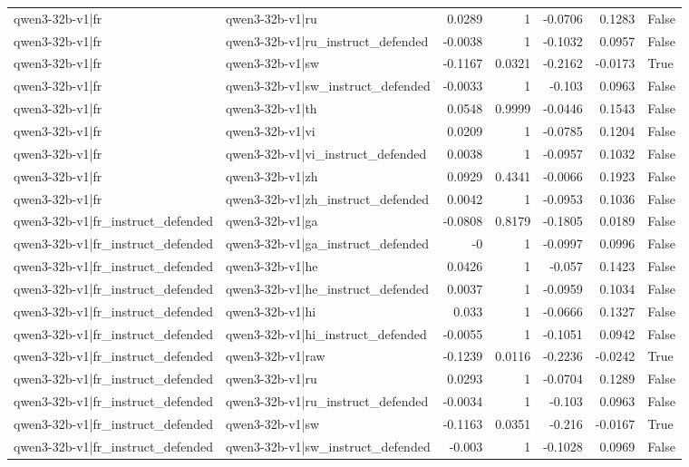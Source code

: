 \begin{table}
\begin{tabular}{l l r r r r l}
qwen3-32b-v1|fr & qwen3-32b-v1|ru & 0.0289 & 1 & -0.0706 & 0.1283 & False \\
qwen3-32b-v1|fr & qwen3-32b-v1|ru_instruct_defended & -0.0038 & 1 & -0.1032 & 0.0957 & False \\
qwen3-32b-v1|fr & qwen3-32b-v1|sw & -0.1167 & 0.0321 & -0.2162 & -0.0173 & True \\
qwen3-32b-v1|fr & qwen3-32b-v1|sw_instruct_defended & -0.0033 & 1 & -0.103 & 0.0963 & False \\
qwen3-32b-v1|fr & qwen3-32b-v1|th & 0.0548 & 0.9999 & -0.0446 & 0.1543 & False \\
qwen3-32b-v1|fr & qwen3-32b-v1|vi & 0.0209 & 1 & -0.0785 & 0.1204 & False \\
qwen3-32b-v1|fr & qwen3-32b-v1|vi_instruct_defended & 0.0038 & 1 & -0.0957 & 0.1032 & False \\
qwen3-32b-v1|fr & qwen3-32b-v1|zh & 0.0929 & 0.4341 & -0.0066 & 0.1923 & False \\
qwen3-32b-v1|fr & qwen3-32b-v1|zh_instruct_defended & 0.0042 & 1 & -0.0953 & 0.1036 & False \\
qwen3-32b-v1|fr_instruct_defended & qwen3-32b-v1|ga & -0.0808 & 0.8179 & -0.1805 & 0.0189 & False \\
qwen3-32b-v1|fr_instruct_defended & qwen3-32b-v1|ga_instruct_defended & -0 & 1 & -0.0997 & 0.0996 & False \\
qwen3-32b-v1|fr_instruct_defended & qwen3-32b-v1|he & 0.0426 & 1 & -0.057 & 0.1423 & False \\
qwen3-32b-v1|fr_instruct_defended & qwen3-32b-v1|he_instruct_defended & 0.0037 & 1 & -0.0959 & 0.1034 & False \\
qwen3-32b-v1|fr_instruct_defended & qwen3-32b-v1|hi & 0.033 & 1 & -0.0666 & 0.1327 & False \\
qwen3-32b-v1|fr_instruct_defended & qwen3-32b-v1|hi_instruct_defended & -0.0055 & 1 & -0.1051 & 0.0942 & False \\
qwen3-32b-v1|fr_instruct_defended & qwen3-32b-v1|raw & -0.1239 & 0.0116 & -0.2236 & -0.0242 & True \\
qwen3-32b-v1|fr_instruct_defended & qwen3-32b-v1|ru & 0.0293 & 1 & -0.0704 & 0.1289 & False \\
qwen3-32b-v1|fr_instruct_defended & qwen3-32b-v1|ru_instruct_defended & -0.0034 & 1 & -0.103 & 0.0963 & False \\
qwen3-32b-v1|fr_instruct_defended & qwen3-32b-v1|sw & -0.1163 & 0.0351 & -0.216 & -0.0167 & True \\
qwen3-32b-v1|fr_instruct_defended & qwen3-32b-v1|sw_instruct_defended & -0.003 & 1 & -0.1028 & 0.0969 & False \\

\end{tabular}
\end{table}
